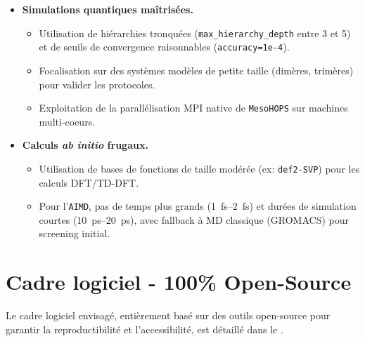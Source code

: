 \documentclass[12pt, a4paper]{article}
\begin{document}
\begin{itemize}
    \item \textbf{Simulations quantiques maîtrisées.}
    \begin{itemize}
        \item Utilisation de hiérarchies tronquées (\texttt{max\_hierarchy\_depth} entre 3 et 5) et de seuils de convergence raisonnables (\texttt{accuracy=1e-4}).
        \item Focalisation sur des systèmes modèles de petite taille (dimères, trimères) pour valider les protocoles.
        \item Exploitation de la parallélisation MPI native de \texttt{MesoHOPS} sur machines multi-coeurs.
\end{itemize}

    \item \textbf{Calculs \textit{ab initio} frugaux.}
    \begin{itemize}
        \item Utilisation de bases de fonctions de taille modérée (ex: \texttt{def2-SVP}) pour les calculs DFT/TD-DFT.
        \item Pour l'\texttt{AIMD}, pas de temps plus grands (\SIrange{1}{2}{\femto\second}) et durées de simulation courtes (\SIrange{10}{20}{\pico\second}), avec fallback à MD classique (GROMACS) pour screening initial.
\end{itemize}
\end{itemize}

\section{Cadre logiciel - 100\% Open-Source}

Le cadre logiciel envisagé, entièrement basé sur des outils open-source pour garantir la reproductibilité et l'accessibilité, est détaillé dans le .
\end{document}
